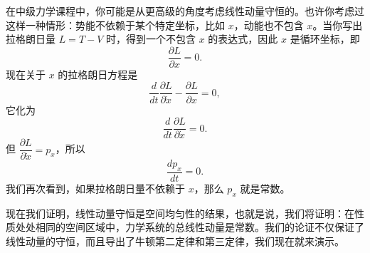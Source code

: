 在中级力学课程中，你可能是从更高级的角度考虑线性动量守恒的。也许你考虑过这样一种情形：势能不依赖于某个特定坐标，比如 $x$，动能也不包含 $x$。当你写出拉格朗日量 $L = T - V$ 时，得到一个不包含 $x$ 的表达式，因此 $x$ 是循环坐标，即
\begin{equation*}
\frac{\partial L}{\partial x} = 0.
\end{equation*}
现在关于 $x$ 的拉格朗日方程是
\begin{equation*}
\frac{d}{dt}\frac{\partial L}{\partial \dot{x}} - \frac{\partial L}{\partial x} = 0,
\end{equation*}
它化为
\begin{equation*}
\frac{d}{dt}\frac{\partial L}{\partial \dot{x}} = 0.
\end{equation*}
但 $\dfrac{\partial L}{\partial \dot{x}} = p_x$，所以
\begin{equation*}
\frac{dp_x}{dt} = 0.
\end{equation*}
我们再次看到，如果拉格朗日量不依赖于 $x$，那么 $p_x$ 就是常数。

现在我们证明，线性动量守恒是空间均匀性的结果，也就是说，我们将证明：在性质处处相同的空间区域中，力学系统的总线性动量是常数。我们的论证不仅保证了线性动量的守恒，而且导出了牛顿第二定律和第三定律，我们现在就来演示。

